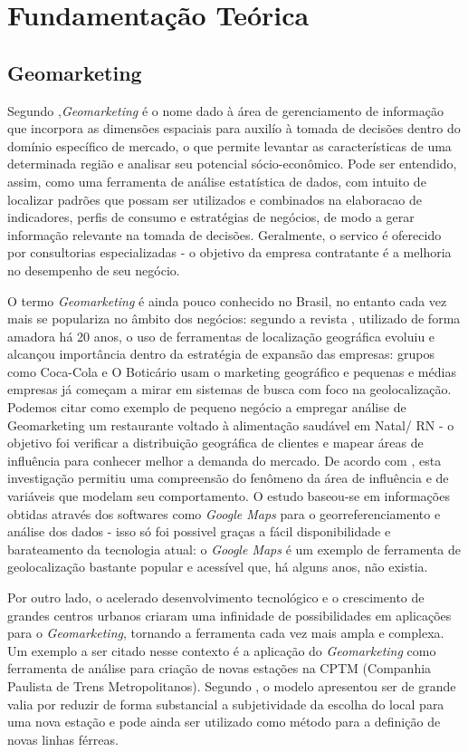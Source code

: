 
\chapter{Fundamentação Teórica} \label{fundamentacao-teorica}

\section{Geomarketing}
\label{Geom}
Segundo ,\emph{Geomarketing} é o nome dado à área de
gerenciamento de informação que incorpora as dimensões espaciais para auxilío à
tomada de decisões dentro do domínio específico de mercado, o que permite
levantar as características de uma determinada região e analisar seu potencial
sócio-econômico. Pode ser entendido, assim, como uma ferramenta de análise
estatística de dados, com intuito de localizar padrões que possam ser utilizados
e combinados na elaboracao de indicadores, perfis de consumo e estratégias de
negócios, de modo a gerar informação relevante na tomada de decisões.
Geralmente, o servico é oferecido por consultorias especializadas - o  objetivo
da empresa  contratante é a melhoria no desempenho de seu negócio.

O termo \emph{Geomarketing} é ainda pouco conhecido no Brasil, no entanto cada
vez mais se populariza no âmbito dos negócios: segundo a revista
, utilizado de forma amadora há 20 anos, o uso de ferramentas
de localização geográfica evoluiu e alcançou importância dentro da estratégia de
expansão das empresas: grupos como Coca-Cola e O Boticário usam o marketing
geográfico e pequenas e médias empresas já começam a mirar em sistemas de busca
com foco na geolocalização. Podemos citar como exemplo de pequeno negócio a
empregar análise de Geomarketing um restaurante voltado à alimentação saudável
em Natal/ RN - o objetivo foi verificar a distribuição geográfica de clientes e
mapear áreas de influência para conhecer melhor a demanda do mercado. De acordo
com , esta investigação permitiu uma compreensão do
fenômeno da área de influência e de variáveis que modelam seu comportamento. O
estudo baseou-se em informações obtidas através dos softwares como \emph{Google
Maps} para o georreferenciamento e análise dos dados - isso só foi possivel
graças a fácil disponibilidade e barateamento da tecnologia atual: o
\emph{Google Maps} é um exemplo de ferramenta de geolocalização bastante popular
e acessível que, há alguns anos, não existia.

Por outro lado, o acelerado desenvolvimento tecnológico e o crescimento de
grandes centros urbanos criaram uma infinidade de possibilidades em aplicações
para o \emph{Geomarketing}, tornando a ferramenta cada vez mais ampla e
complexa. Um exemplo a ser citado nesse contexto é a aplicação do
\emph{Geomarketing} como ferramenta de análise para criação de novas estações na
CPTM (Companhia Paulista de Trens Metropolitanos). Segundo
, o modelo apresentou ser de grande valia por reduzir de
forma substancial a subjetividade da escolha do local para uma nova estação e
pode ainda ser utilizado como método para a definição de novas linhas férreas.

